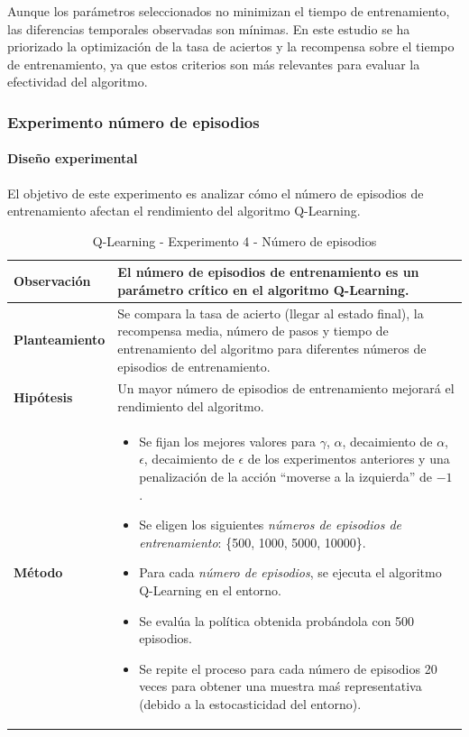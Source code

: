 Aunque los parámetros seleccionados no minimizan el tiempo de entrenamiento, las diferencias temporales observadas son mínimas. En este estudio se ha priorizado la optimización de la tasa de aciertos y la recompensa sobre el tiempo de entrenamiento, ya que estos criterios son más relevantes para evaluar la efectividad del algoritmo.
\newpage
\subsubsection{Experimento número de episodios}

\paragraph{Diseño experimental}
El objetivo de este experimento es analizar cómo el número de episodios de entrenamiento afectan el rendimiento del algoritmo Q-Learning.
\begin{table}[H]
    \centering
    \begin{tabularx}{\textwidth}{|p{4cm}|X|} %
        \hline %
        \textbf{Observación} & El número de episodios de entrenamiento es un parámetro crítico en el algoritmo Q-Learning.
        \\ \hline
        \textbf{Planteamiento} & Se compara la tasa de acierto (llegar al estado final), la recompensa media, número de pasos y tiempo de entrenamiento del algoritmo para diferentes números de episodios de entrenamiento.
        \\ \hline
        \textbf{Hipótesis} & Un mayor número de episodios de entrenamiento mejorará el rendimiento del algoritmo.
        \\ \hline
        \textbf{Método} &
        \begin{itemize}
            \item Se fijan los mejores valores para \(\gamma\), \(\alpha\), decaimiento de \(\alpha\), \(\epsilon\), decaimiento de \(\epsilon\) de los experimentos anteriores y una penalización de la acción ``moverse a la izquierda'' de $-1$.
            \item Se eligen los siguientes \textit{números de episodios de entrenamiento}: \{500, 1000, 5000, 10000\}.
            \item Para cada \textit{número de episodios}, se ejecuta el algoritmo Q-Learning en el entorno.
            \item Se evalúa la política obtenida probándola con 500 episodios.
            \item Se repite el proceso para cada número de episodios 20 veces para obtener una muestra maś representativa (debido a la estocasticidad del entorno).
        \end{itemize}
        \\ \hline
    \end{tabularx}
    \caption{Q-Learning - Experimento 4 - Número de episodios}
    \label{tab:diseñoQLEarningExp3}
\end{table}


